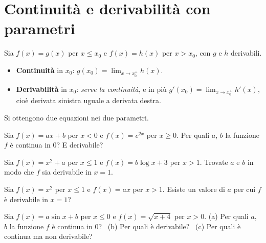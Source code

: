\section{Continuità e derivabilità con parametri}

\begin{vuoto}[Promemoria]{}
Sia $f(x)=g(x)$ per $x\le x_0$ e $f(x)=h(x)$ per $x>x_0$, con $g$ e $h$ derivabili.
\begin{itemize}
\item \textbf{Continuità} in $x_0$: $g(x_0)=\lim_{x\to x_0^+}h(x)$.
\item \textbf{Derivabilità} in $x_0$: \emph{serve la continuità}, e in più $g'(x_0)=\lim_{x\to x_0^+}h'(x)$, cioè derivata sinistra uguale a derivata destra.
\end{itemize}
Si ottengono due equazioni nei due parametri.
\end{vuoto}

\begin{esercizio}[\liv{1}]
Sia $f(x)=ax+b$ per $x<0$ e $f(x)=e^{2x}$ per $x\ge0$. Per quali $a$, $b$ la funzione $f$ è continua in $0$? E derivabile?
\end{esercizio}

\begin{esercizio}[\liv{2}]
Sia $f(x)=x^2+a$ per $x\le1$ e $f(x)=b\log x+3$ per $x>1$. Trovate $a$ e $b$ in modo che $f$ sia derivabile in $x=1$.
\end{esercizio}

\begin{esercizio}[\liv{2}]
Sia $f(x)=x^2$ per $x\le1$ e $f(x)=ax$ per $x>1$. Esiste un valore di $a$ per cui $f$ è derivabile in $x=1$?
\end{esercizio}

\begin{esercizio}[\liv{3}]
Sia $f(x)=a\sin x+b$ per $x\le0$ e $f(x)=\sqrt{x+4}$ per $x>0$. (a) Per quali $a$, $b$ la funzione $f$ è continua in $0$? \ (b) Per quali è derivabile? \ (c) Per quali è continua ma non derivabile?
\end{esercizio}

\stampasoluzioni
